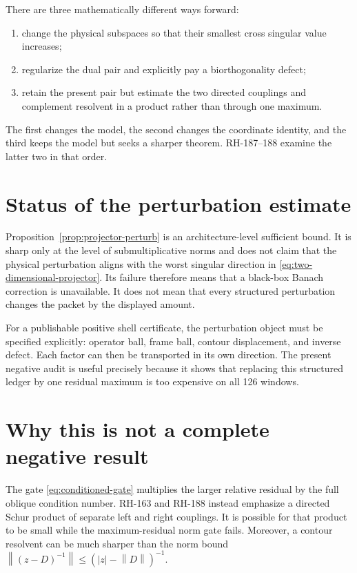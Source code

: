 \documentclass[12pt]{article}
\theoremstyle{remark}
\newcommand{\norm}[1]{\left\lVert#1\right\rVert}
\begin{document}
There are three mathematically different ways forward:
\begin{enumerate}[leftmargin=2em]
\item change the physical subspaces so that their smallest cross singular
 value increases;
\item regularize the dual pair and explicitly pay a biorthogonality defect;
\item retain the present pair but estimate the two directed couplings and
 complement resolvent in a product rather than through one maximum.
\end{enumerate}
The first changes the model, the second changes the coordinate identity, and
the third keeps the model but seeks a sharper theorem.  RH-187--188 examine
the latter two in that order.

\section{Status of the perturbation estimate}

Proposition~\ref{prop:projector-perturb} is an architecture-level sufficient
bound.  It is sharp only at the level of submultiplicative norms and does not
claim that the physical perturbation aligns with the worst singular
direction in \eqref{eq:two-dimensional-projector}.  Its failure therefore
means that a black-box Banach correction is unavailable.  It does not mean
that every structured perturbation changes the packet by the displayed
amount.

For a publishable positive shell certificate, the perturbation object must
be specified explicitly: operator ball, frame ball, contour displacement,
and inverse defect.  Each factor can then be transported in its own
direction.  The present negative audit is useful precisely because it shows
that replacing this structured ledger by one residual maximum is too
expensive on all 126 windows.

\section{Why this is not a complete negative result}

The gate \eqref{eq:conditioned-gate} multiplies the larger relative residual
by the full oblique condition number.  RH-163 and RH-188 instead emphasize a
directed Schur product of separate left and right couplings.  It is possible
for that product to be small while the maximum-residual norm gate fails.
Moreover, a contour resolvent can be much sharper than the norm bound
$\norm{(z-D)^{-1}}\le(|z|-\norm D)^{-1}$.
\end{document}
